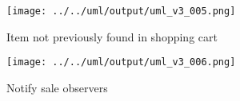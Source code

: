 \documentclass[a4paper]{scrreprt}
\begin{document}
\begin{figure}[h!]
    \begin{center}
        \texttt{[image: ../../uml/output/uml\_v3\_005.png]}
        \caption{Item not previously found in shopping cart}
        \label{fig:item-not-in-shopping-cart}
    \end{center}
\end{figure}

\begin{figure}[h!]
    \begin{center}
        \texttt{[image: ../../uml/output/uml\_v3\_006.png]}
        \caption{Notify sale observers}
        \label{fig:notify-sale-observers}
    \end{center}
\end{figure}
\end{document}
